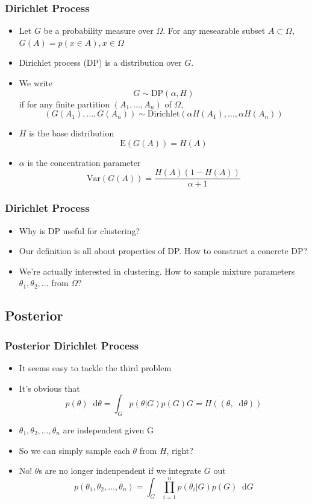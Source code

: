 \documentclass{beamer}
\newcommand*\diff{\mathop{}\!\mathrm{d}}
\begin{document}
\begin{frame}
	\frametitle{Dirichlet Process}
	\begin{itemize}
		\item Let $G$ be a probability measure over $\Omega$. For any mesearable subset $A\subset \Omega$, $G(A)=p(x\in A), x\in \Omega$
		\item Dirichlet process (DP) is a distribution over $G$. 
		\item We write 
		\[
			G \sim \text{DP}(\alpha, H)
		\]
		if for any finite partition $(A_1, \ldots, A_n)$ of $\Omega$,
		\[
			(G(A_1), \ldots, G(A_n)) \sim \text{Dirichlet}(\alpha H(A_1), \ldots, \alpha H(A_n))
		\]
		\item $H$ is the {\color{red} base distribution}
		\[
		\text{E}(G(A)) = H(A)
		\]
		\item $\alpha$ is the {\color{red} concentration parameter}
		\[
		\text{Var}(G(A)) = \frac{H(A)(1-H(A))}{\alpha+1}
		\]
	\end{itemize}
\end{frame}

\begin{frame}
	\frametitle{Dirichlet Process}
	\begin{itemize}
		\item{Why is DP useful for clustering?}
		\item{Our definition is all about properties of DP. How to construct a concrete DP?}
		\item{We're actually interested in clustering. How to sample mixture parameters $\theta_1, \theta_2, \ldots$ from $\Omega$?}	
	\end{itemize}
\end{frame}
\subsection{Posterior}
\begin{frame}
	\frametitle{Posterior Dirichlet Process}
	\begin{itemize}
		\item{It seems easy to tackle the third problem}
		\item{It's obvious that}
		\[
			p(\theta) \diff \theta = \int_G p(\theta|G)p(G)  G = H((\theta,\diff \theta))
		\]
		\item{$\theta_1, \theta_2, \ldots, \theta_n$ are independent given G}
		\item So we can simply sample each $\theta$ from $H$, right?
		\item No! $\theta$s are no longer indenpendent if we integrate $G$ out
		\[
			p(\theta_1, \theta_2, \ldots, \theta_n) = \int_G \prod_{i=1}^{n} p(\theta_i|G)p(G) \diff G
		\]
	\end{itemize}
\end{frame}
\end{document}
